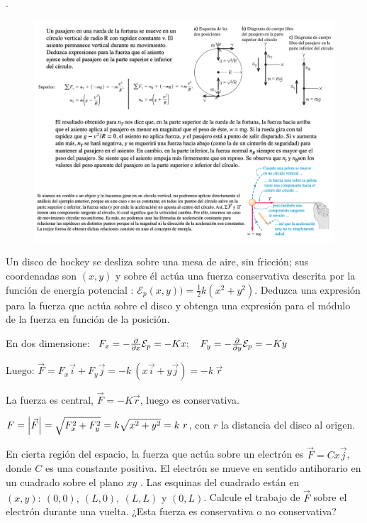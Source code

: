  \begin{prob}.
 \begin{figure}[H]
	\centering
	\includegraphics[width=1\textwidth]{imagenes/imagenes03/T03IM46.png}
	\end{figure}
 \end{prob}
 

\begin{prob}
Un disco de hockey se desliza sobre una mesa de aire, sin fricción; sus coordenadas son $(x,y)$ y sobre él actúa una fuerza conservativa descrita por la función de energía potencial	: $\mathcal E_p(x,y) )= \frac 1 2 k(x^2+y^2)$. Deduzca una expresión para la fuerza que actúa sobre el disco y obtenga una expresión para el módulo de la fuerza en función de la posición.
\end{prob}

En dos dimensione: $\ F_x=-\pdv{x}\mathcal E_p=-Kx; \quad F_y=-\pdv{y}\mathcal E_p=-Ky$

Luego: $\overrightarrow{F}=F_x \vec i + F_y \vec j = -k \ (x\vec i + y \vec j)=-k \ \overrightarrow{r}$

\textcolor{gris}{La fuerza es central, $\overrightarrow{F}=-K \vec r$, luego es conservativa.}

$F=\abs{\vec F}=\sqrt{F_x^2+F_y^2}=k\sqrt{x^2+y^2}=k\ r$, con $r$ la distancia del disco al origen.

\begin{prob}
En cierta región del espacio, la fuerza que actúa sobre un electrón es $\vec F=  Cx\vec j$, donde $C$ es una constante positiva. El electrón se mueve en sentido antihorario en un cuadrado sobre el plano $xy$ . Las esquinas del cuadrado están en $(x, y):\  (0, 0),\ (L, 0),\ (L, L) \text{ y } (0, L)$. Calcule el trabajo de $\vec F$ sobre el electrón durante una vuelta. ¿Esta fuerza es conservativa o no conservativa?	
\end{prob}

